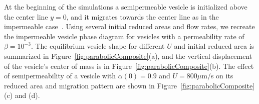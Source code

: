\documentclass[9pt,twocolumn,twoside,lineno]{pnas-new}
\begin{document}
%
%
%
%
%
%

At the beginning of the simulations a semipermeable vesicle is
initialized above the center line $y=0$, and it migrates towards the
center line as in the impermeable case~\cite{dan-vla-mis2009}. 
%
%
%
Using several initial reduced areas and flow rates, we recreate the
impermeable vesicle phase diagram for vesicles with a permeability rate
of $\beta = 10^{-3}$. The equilibrium vesicle shape for different $U$
and initial reduced area is summarized in
Figure~\ref{fig:parabolicComposite}(a), and the vertical displacement of
the vesicle's center of mass is in
Figure~\ref{fig:parabolicComposite}(b). The effect of semipermeability
of a vesicle with $\alpha(0) = 0.9$ and $U=800 \mu$m/s on its reduced
area and migration pattern are shown in
Figure~\ref{fig:parabolicComposite}(c) and (d). 
\end{document}
